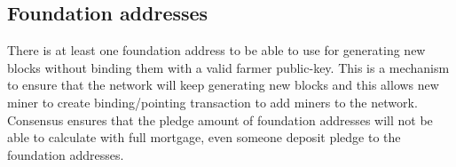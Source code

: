 \subsection{Foundation addresses}
\begin{flushleft}
    There is at least one foundation address to be able to use for generating new blocks without binding them with a valid farmer public-key. This is a mechanism to ensure that the network will keep generating new blocks and this allows new miner to create binding/pointing transaction to add miners to the network. Consensus ensures that the pledge amount of foundation addresses will not be able to calculate with full mortgage, even someone deposit pledge to the foundation addresses.
\end{flushleft}
